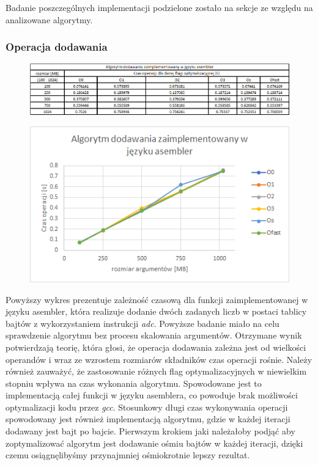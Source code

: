 \documentclass{article}
\begin{document}
Badanie poszczególnych implementacji podzielone zostało na sekcje ze względu na analizowane algorytmy.

\subsubsection{Operacja dodawania}

\begin{figure}[h!]

\includegraphics[scale=0.65]{charts/add_asm.png}

\end{figure}

\begin{figure}[h!]
\centering
\includegraphics[scale=0.75]{charts/add_asm_p.png}

\end{figure}

\vspace{5mm}

Powyższy wykres prezentuje zależność czasową dla funkcji zaimplementowanej w języku asembler, która realizuje dodanie dwóch zadanych liczb w postaci tablicy bajtów z wykorzystaniem instrukcji \textit{adc}. Powyższe badanie miało na celu sprawdzenie algorytmu bez procesu skalowania argumentów. Otrzymane wynik potwierdzają teorię, która głosi, że operacja dodawania zależna jest od wielkości operandów i wraz ze wzrostem rozmiarów składników czas operacji rośnie. Należy również zauważyć, że zastosowanie różnych flag optymalizacyjnych w niewielkim stopniu wpływa na czas wykonania algorytmu. Spowodowane jest to implementacją całej funkcji w języku asemblera, co powoduje brak możliwości optymalizacji kodu przez \textit{gcc}. Stosunkowy długi czas wykonywania operacji spowodowany jest również implementacją algorytmu, gdzie w każdej iteracji dodawany jest bajt po bajcie. Pierwszym krokiem jaki należałoby podjąć aby zoptymalizować algorytm jest dodawanie ośmiu bajtów w każdej iteracji, dzięki czemu osiągnęlibyśmy przynajmniej ośmiokrotnie lepszy rezultat.
\end{document}
